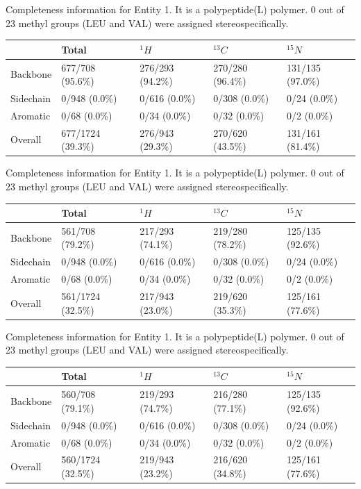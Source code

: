 Completeness information for Entity 1. It is a polypeptide(L) polymer. 0 out of 23 methyl groups (LEU and VAL) were assigned stereospecifically.\begin{longtable}{|l|l|l|l|l|}
\hline
  & Total & $^{1}H$ & $^{13}C$ & $^{15}N$\\\hline
Backbone & 677/708 (95.6\%)& 276/293 (94.2\%)& 270/280 (96.4\%)& 131/135 (97.0\%) \\
\hline
Sidechain & 0/948 (0.0\%)& 0/616 (0.0\%)& 0/308 (0.0\%)& 0/24 (0.0\%) \\
\hline
Aromatic & 0/68 (0.0\%)& 0/34 (0.0\%)& 0/32 (0.0\%)& 0/2 (0.0\%) \\
\hline
Overall & 677/1724 (39.3\%)& 276/943 (29.3\%)& 270/620 (43.5\%)& 131/161 (81.4\%) \\
\hline
\end{longtable}
Completeness information for Entity 1. It is a polypeptide(L) polymer. 0 out of 23 methyl groups (LEU and VAL) were assigned stereospecifically.\begin{longtable}{|l|l|l|l|l|}
\hline
  & Total & $^{1}H$ & $^{13}C$ & $^{15}N$\\\hline
Backbone & 561/708 (79.2\%)& 217/293 (74.1\%)& 219/280 (78.2\%)& 125/135 (92.6\%) \\
\hline
Sidechain & 0/948 (0.0\%)& 0/616 (0.0\%)& 0/308 (0.0\%)& 0/24 (0.0\%) \\
\hline
Aromatic & 0/68 (0.0\%)& 0/34 (0.0\%)& 0/32 (0.0\%)& 0/2 (0.0\%) \\
\hline
Overall & 561/1724 (32.5\%)& 217/943 (23.0\%)& 219/620 (35.3\%)& 125/161 (77.6\%) \\
\hline
\end{longtable}
Completeness information for Entity 1. It is a polypeptide(L) polymer. 0 out of 23 methyl groups (LEU and VAL) were assigned stereospecifically.\begin{longtable}{|l|l|l|l|l|}
\hline
  & Total & $^{1}H$ & $^{13}C$ & $^{15}N$\\\hline
Backbone & 560/708 (79.1\%)& 219/293 (74.7\%)& 216/280 (77.1\%)& 125/135 (92.6\%) \\
\hline
Sidechain & 0/948 (0.0\%)& 0/616 (0.0\%)& 0/308 (0.0\%)& 0/24 (0.0\%) \\
\hline
Aromatic & 0/68 (0.0\%)& 0/34 (0.0\%)& 0/32 (0.0\%)& 0/2 (0.0\%) \\
\hline
Overall & 560/1724 (32.5\%)& 219/943 (23.2\%)& 216/620 (34.8\%)& 125/161 (77.6\%) \\
\hline
\end{longtable}
